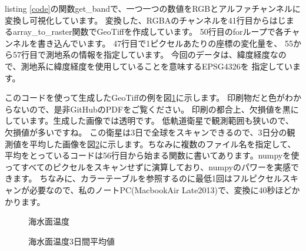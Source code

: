 listing \ref{code}の関数get\_bandで、一つ一つの数値をRGBとアルファチャンネルに変換し可視化しています。
変換した、RGBAのチャンネルを41行目からはじまるarray\_to\_raster関数でGeoTiffを作成しています。
50行目のforループで各チャンネルを書き込んでいます。
47行目で1ピクセルあたりの座標の変化量を、
55から57行目で測地系の情報を指定しています。
今回のデータは、緯度経度なので、測地系に緯度経度を使用していることを意味するEPSG4326を
指定しています。

このコードを使って生成したGeoTiffの例を図\ref{fig:sst}に示します。
印刷物だと色がわからないので、是非GitHubのPDFをご覧ください。
印刷の都合上、欠損値を黒にしています。生成した画像では透明です。
低軌道衛星で観測範囲も狭いので、欠損値が多いですね。
この衛星は3日で全球をスキャンできるので、3日分の観測値を平均した画像を図\ref{fig:sst-ave}に示します。ちなみに複数のファイル名を指定して、平均をとっているコードは56行目から始まる関数に書いてあります。numpyを使ってすべてのピクセルをスキャンせずに演算しており、numpyのパワーを実感できます。
ちなみに、カラーテーブルを参照するのに最低1回はフルピクセルスキャンが必要なので、私のノートPC(MacbookAir Late2013)で、変換に40秒ほどかかります。


\begin{figure}[t]
\centering
{}
\caption{海水面温度}
\label{fig:sst}
\end{figure}

\begin{figure}[t]
\centering
{}
\caption{海水面温度3日間平均値}
\label{fig:sst-ave}
\end{figure}

\clearpage


